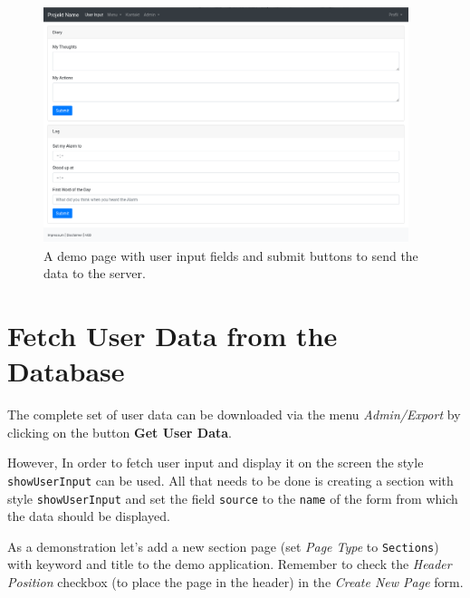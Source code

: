 \documentclass[a4paper,oneside]{book}
\begin{document}
\begin{figure}[ht]
    \centering
    \includegraphics[width=0.95\textwidth]{form_empty.png}
    \caption{A demo page with user input fields and submit buttons to send the data to the server.}
    \label{fig.form-empty}
\end{figure}

\section{Fetch User Data from the Database}

The complete set of user data can be downloaded via the menu \emph{Admin/Export} by clicking on the button \textbf{Get User Data}.

However, In order to fetch user input and display it on the screen the style \texttt{showUserInput} can be used.
All that needs to be done is creating a section with style \texttt{showUserInput} and set the field \texttt{source} to the \texttt{name} of the form from which the data should be displayed.

As a demonstration let's add a new section page (set \emph{Page Type} to \texttt{Sections}) with keyword  and title  to the demo application.
Remember to check the \emph{Header Position} checkbox (to place the page in the header) in the \emph{Create New Page} form.
\end{document}
